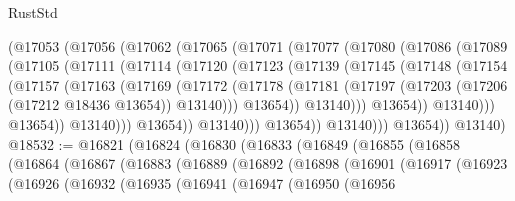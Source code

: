 \begin{lexlean}{RustStd}
\begin{coremodule}
              (@17053
                (@17056
                  (@17062
                    (@17065
                      (@17071
                        (@17077
                          (@17080
                            (@17086
                              (@17089
                                (@17105
                                  (@17111
                                    (@17114
                                      (@17120
                                        (@17123
                                          (@17139
                                            (@17145
                                              (@17148
                                                (@17154
                                                  (@17157
                                                    (@17163
                                                      (@17169
                                                        (@17172
                                                          (@17178
                                                            (@17181
                                                              (@17197
                                                                (@17203
                                                                  (@17206 (@17212 @18436 @13654))
                                                                  @13140)))
                                                            @13654))
                                                        @13140)))
                                                  @13654))
                                              @13140)))
                                        @13654))
                                    @13140)))
                              @13654))
                          @13140)))
                    @13654))
                @13140)))
          @13654))
      @13140)
@18532 := @16821
    (@16824
      (@16830
        (@16833
          (@16849
            (@16855
              (@16858
                (@16864
                  (@16867
                    (@16883
                      (@16889
                        (@16892
                          (@16898
                            (@16901
                              (@16917
                                (@16923
                                  (@16926
                                    (@16932
                                      (@16935
                                        (@16941
                                          (@16947
                                            (@16950
                                              (@16956

\end{coremodule}
\end{lexlean}
